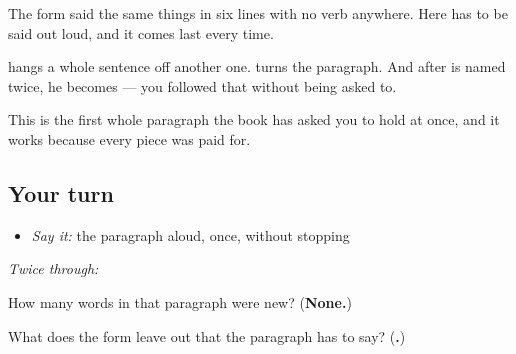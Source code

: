 \begin{grammarlens}[title={What you've built}]
The form said the same things in six lines with no verb anywhere. Here \textbf{} has to be said out loud, and it comes last every time.

\textbf{} hangs a whole sentence off another one. \textbf{} turns the paragraph. And after \textbf{} is named twice, he becomes \textbf{} — you followed that without being asked to.

This is the first whole paragraph the book has asked you to hold at once, and it works because every piece was paid for.
\end{grammarlens}

\subsection*{Your turn}
\begin{itemize}
\raggedright
  \item \emph{Say it:} the paragraph aloud, once, without stopping
\end{itemize}

\emph{Twice through:}

\begin{tcolorbox}[breakable,colback=teal!4,colframe=teal!35!black,title={Before you move on}]
How many words in that paragraph were new? (\textbf{None.})

What does the form leave out that the paragraph has to say? (\textbf{.})
\end{tcolorbox}
